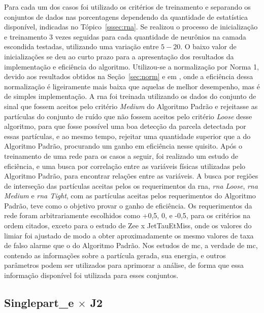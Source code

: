 Para cada um dos casos foi utilizado os critérios de treinamento e separando os 
conjuntos de dados nas porcentagens dependendo da quantidade de estatística
disponível, indicadas no Tópico~\ref{sssec:rna}. Se realizou o processo de
inicialização e treinamento 3 vezes seguidas para cada quantidade de neurônios na camada
escondida testadas, utilizando uma variação entre $5-20$. O baixo valor de
inicializações se deu ao curto prazo para a apresentação dos resultados da
implementação e eficiência do algoritmo. 
Utilizou-se a normalização por Norma 1,
devido aos resultados obtidos na Seção~\ref{sec:norm} e em \cite{tese_torres},
onde a eficiência dessa normalização é ligeiramente mais baixa que aquelas de
melhor desempenho, mas é de simples implementação. A \gls{rna} foi treinada utilizando os
dados do conjunto de sinal que fossem aceitos pelo critério \emph{Medium} do
Algoritmo Padrão e rejeitasse as partículas do conjunto de ruído que não fossem
aceitos pelo critério \emph{Loose} desse algoritmo, para que fosse possível uma
boa detecção da parcela detectada por essas partículas, e ao mesmo tempo,
rejeitar uma quantidade superior que a do Algoritmo Padrão, procurando um ganho em
eficiência nesse quisito. Após o treinamento de uma rede para os casos a seguir,
foi realizado um estudo de eficiência, e uma busca por correlação
entre as variáveis físicas utilizadas pelo Algoritmo Padrão, para encontrar relações entre as
variáveis. A busca por regiões de interseção das partículas aceitas pelos os
requerimentos da \gls{rna}, \emph{\gls{rna} Loose}, \emph{\gls{rna} Medium} e
\emph{\gls{rna} Tight}, com as partículas aceitas pelos requerimentos do
Algoritmo Padrão, teve como o objetivo provar o ganho de eficiência. Os
requerimentos da rede foram arbitrariamente escolhidos como +0,5, 0, e -0,5,
para os critérios na ordem citados, exceto para o estudo de Zee x JetTauEtMiss,
onde os valores do limiar foi ajustado de modo a obter aproximadamente os mesmo
valores de taxa de falso alarme que o do Algoritmo Padrão. Nos estudos
de \gls{mc}, a verdade de \gls{mc}, contendo as informações sobre a partícula
gerada, sua energia, e outros parâmetros podem ser utilizados para aprimorar a
análise, de forma que essa informação disponível foi utilizada para esses
conjuntos.


\FloatBarrier

\subsection{\texorpdfstring{Singlepart\_e $\times$ J2}{Singlepart\_e x J2}}
\label{ssec:single_e}


